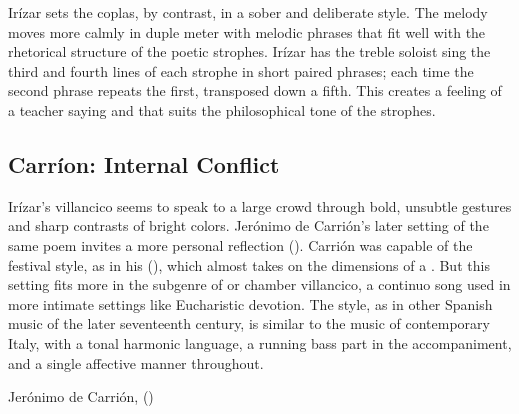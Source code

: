 
Irízar sets the coplas, by contrast, in a sober and deliberate style.
The melody moves more calmly in duple meter with melodic phrases that fit well
with the rhetorical structure of the poetic strophes.  
Irízar has the treble soloist sing the third and fourth lines of each strophe in
short paired phrases; each time the second phrase repeats the first, transposed
down a fifth.
This creates a feeling of a teacher saying  and
 that suits the philosophical tone of the strophes.

\addtoindex{
    \IrizarM|)
}

\subsection{Carríon: Internal Conflict}

Irízar's villancico seems to speak to a large crowd through bold, unsubtle
gestures and sharp contrasts of bright colors.
Jerónimo de Carrión's later setting of the same poem invites a more personal
reflection ().%
    \Autocite[149--152]{Cashner:WLSCM32}
Carrión was capable of the festival style, as in his  (), which almost takes on the dimensions of a
.  
But this setting fits more in the subgenre of  or chamber
villancico, a continuo song used in more intimate settings like Eucharistic
devotion.%
    \Autocite[See, for example][]{Robledo:MadridTonos}
The style, as in other Spanish music of the later seventeenth century, is
similar to the  music of contemporary Italy, with a tonal
harmonic language, a running bass part in the accompaniment, and a single
affective manner throughout.


{Jerónimo de Carrión, 
()}

